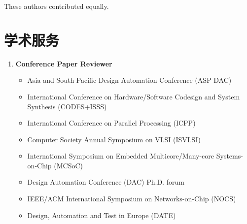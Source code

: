 \documentclass{mycv}
\begin{document}
{
\footnotesize %
\textsuperscript{\textdagger}These authors contributed equally.
}

\section{学术服务}

\begin{enumerate}[label={}]
  \item \textbf{Conference Paper Reviewer}
  \begin{itemize}
	\item Asia and South Pacific Design Automation Conference (ASP-DAC)
	\item International Conference on Hardware/Software Codesign and System
	Synthesis (CODES+ISSS)
	\item International Conference on Parallel Processing (ICPP)
	\item Computer Society Annual Symposium on VLSI (ISVLSI)
	\item International Symposium on Embedded Multicore/Many-core Systems-on-Chip (MCSoC)
	\item Design Automation Conference (DAC) Ph.D. forum
	\item IEEE/ACM International Symposium on Networks-on-Chip (NOCS)
	\item Design, Automation and Test in Europe (DATE)

\end{itemize}
\end{enumerate}
\end{document}
